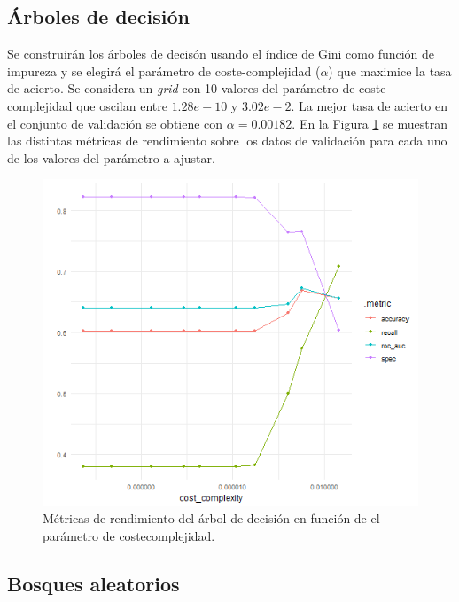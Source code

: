 \documentclass[12pt,a4paper,]{book}
\numberwithin{dummy}{section}
\theoremstyle{ocrenumbox}
\theoremstyle{blacknumex}
\theoremstyle{blacknumbox}
\theoremstyle{ocrenum}
\theoremstyle{ocrenum}
\begin{document}
\hypertarget{uxe1rboles-de-decisiuxf3n}{%
\subsection{Árboles de decisión}\label{uxe1rboles-de-decisiuxf3n}}

Se construirán los árboles de decisón usando el índice de Gini como
función de impureza y se elegirá el parámetro de coste-complejidad
(\(\alpha\)) que maximice la tasa de acierto. Se considera un
\emph{grid} con 10 valores del parámetro de coste-complejidad que
oscilan entre \(1.28e-10\) y \(3.02e- 2\). La mejor tasa de acierto en
el conjunto de validación se obtiene con \(\alpha = 0.00182\). En la
Figura \ref{fig:dt_tuningplot} se muestran las distintas métricas de
rendimiento sobre los datos de validación para cada uno de los valores
del parámetro a ajustar.

\begin{figure}[h]
\centering
\includegraphics[width =\textwidth]{graficos/dt_tuningplot.png}
\caption{Métricas de rendimiento del árbol de decisión en función de el parámetro de coste\-complejidad.}
\label{fig:dt_tuningplot}
\end{figure}

\hypertarget{bosques-aleatorios}{%
\subsection{Bosques aleatorios}\label{bosques-aleatorios}}
\end{document}
